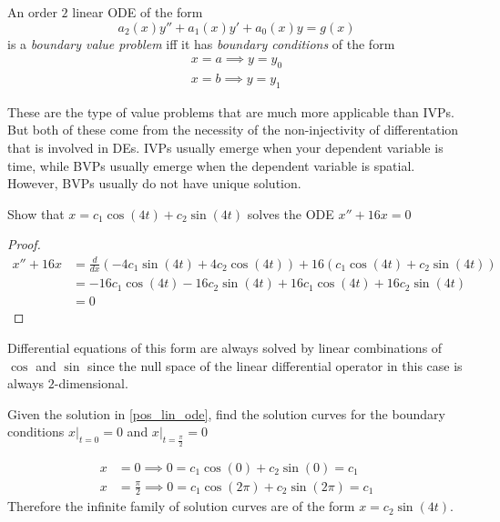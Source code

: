 \documentclass[notes]{subfiles}
\begin{document}
\begin{definition}
    An order $2$ linear ODE of the form
    \[
        a_2(x)y'' + a_1(x)y' + a_0(x)y = g(x)
    \]
    is a \textit{boundary value problem} iff it has \textit{boundary conditions} of the form
    \begin{align*}
        x = a \implies y = y_0 \\
        x = b \implies y = y_1
    \end{align*}
\end{definition}
These are the type of value problems that are much more applicable than IVPs. But both of these come from the necessity of the non-injectivity of differentation that is involved in DEs. IVPs usually emerge when your dependent variable is time, while BVPs usually emerge when the dependent variable is spatial. However, BVPs usually do not have unique solution.

\begin{exercise} \label{pos_lin_ode}
    Show that $x = c_1\cos(4t) + c_2\sin(4t)$ solves the ODE $x'' + 16x = 0$
\end{exercise}
\begin{proof}
    \begin{align*}
        x'' + 16x
        &= \frac{d}{dx}(-4c_1\sin(4t) + 4c_2\cos(4t)) + 16(c_1\cos(4t) + c_2\sin(4t)) \\
        &= -16c_1\cos(4t) - 16c_2\sin(4t) + 16c_1\cos(4t) + 16c_2\sin(4t) \\
        &= 0
    \end{align*}
\end{proof}
Differential equations of this form are always solved by linear combinations of $\cos$ and $\sin$ since the null space of the linear differential operator in this case is always $2$-dimensional.

\begin{exercise}
    Given the solution in \cref{pos_lin_ode}, find the solution curves for the boundary conditions $x|_{t = 0} = 0$ and $x|_{t = \frac{\pi}{2}} = 0$
\end{exercise}
\begin{solution}
    \begin{align*}
        x &= 0 \implies 0 = c_1\cos(0) + c_2\sin(0) = c_1 \\
        x &= \frac{\pi}{2} \implies 0 = c_1\cos(2\pi) + c_2\sin(2\pi) = c_1
    \end{align*}
    Therefore the infinite family of solution curves are of the form $x = c_2\sin(4t)$.
\end{solution}
\end{document}

